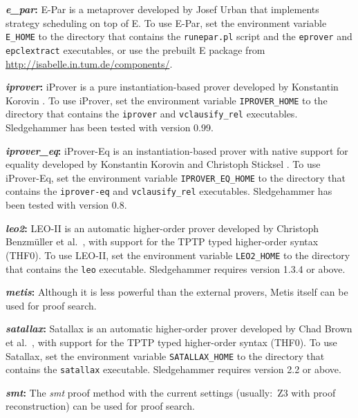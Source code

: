 \documentclass[a4paper,12pt]{article}
\newcommand\download{\url{http://isabelle.in.tum.de/components/}}
\begin{document}
\begin{enum}
\begin{sloppy}
\begin{enum}
\item[\labelitemi] \textbf{\textit{e\_par}:} E-Par is a metaprover developed
by Josef Urban that implements strategy scheduling on top of E. To use
E-Par, set the environment variable \texttt{E\_HOME} to the directory
that contains the \texttt{runepar.pl} script and the \texttt{eprover} and
\texttt{epclextract} executables, or use the prebuilt E package from \download.

\item[\labelitemi] \textbf{\textit{iprover}:} iProver is a pure
instantiation-based prover developed by Konstantin Korovin \cite{korovin-2009}.
To use iProver, set the environment variable \texttt{IPROVER\_HOME} to the
directory that contains the \texttt{iprover} and \texttt{vclausify\_rel}
executables. Sledgehammer has been tested with version 0.99.

\item[\labelitemi] \textbf{\textit{iprover\_eq}:} iProver-Eq is an
instantiation-based prover with native support for equality developed by
Konstantin Korovin and Christoph Sticksel \cite{korovin-sticksel-2010}. To use
iProver-Eq, set the environment variable \texttt{IPROVER\_EQ\_HOME} to the
directory that contains the \texttt{iprover-eq} and \texttt{vclausify\_rel}
executables. Sledgehammer has been tested with version 0.8.

\item[\labelitemi] \textbf{\textit{leo2}:} LEO-II is an automatic
higher-order prover developed by Christoph Benzm\"uller et al.\ \cite{leo2},
with support for the TPTP typed higher-order syntax (THF0). To use LEO-II, set
the environment variable \texttt{LEO2\_HOME} to the directory that contains the
\texttt{leo} executable. Sledgehammer requires version 1.3.4 or above.

\item[\labelitemi] \textbf{\textit{metis}:} Although it is less powerful than
the external provers, Metis itself can be used for proof search.

\item[\labelitemi] \textbf{\textit{satallax}:} Satallax is an automatic
higher-order prover developed by Chad Brown et al.\ \cite{satallax}, with
support for the TPTP typed higher-order syntax (THF0). To use Satallax, set the
environment variable \texttt{SATALLAX\_HOME} to the directory that contains the
\texttt{satallax} executable. Sledgehammer requires version 2.2 or above.

\item[\labelitemi] \textbf{\textit{smt}:} The \textit{smt} proof method with the
current settings (usually:\ Z3 with proof reconstruction) can be used for proof
search.


\end{enum}
\end{sloppy}
\end{enum}
\end{document}

